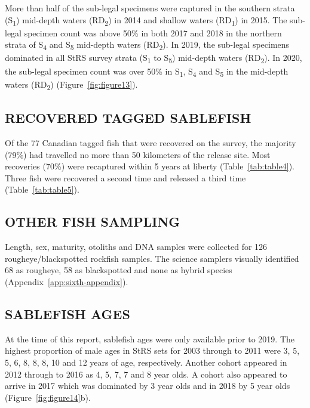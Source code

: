 \documentclass[12pt]{article}\usepackage[]{graphicx}\usepackage[]{color}
\begin{document}
More than half of the sub-legal specimens were captured in the southern strata (S\textsubscript{1}) mid-depth waters (RD\textsubscript{2}) in 2014 and shallow waters (RD\textsubscript{1}) in 2015. The sub-legal specimen count was above 50\% in both 2017 and 2018 in the northern strata of S\textsubscript{4} and S\textsubscript{5} mid-depth waters (RD\textsubscript{2}). In 2019, the sub-legal specimens dominated in all StRS survey strata (S\textsubscript{1} to S\textsubscript{5}) mid-depth waters (RD\textsubscript{2}). In 2020, the sub-legal specimen count was over 50\% in S\textsubscript{1}, S\textsubscript{4} and S\textsubscript{5} in the mid-depth waters (RD\textsubscript{2}) (Figure~\ref{fig:figure13}).

\hypertarget{recovered-tagged-sablefish}{%
\subsection{RECOVERED TAGGED SABLEFISH}\label{recovered-tagged-sablefish}}

Of the 77 Canadian tagged fish that were recovered on the survey, the majority (79\%) had travelled no more than 50 kilometers of the release site. Most recoveries (70\%) were recaptured within 5 years at liberty (Table~\ref{tab:table4}). Three fish were recovered a second time and released a third time (Table~\ref{tab:table5}).

\hypertarget{other-fish-sampling}{%
\subsection{OTHER FISH SAMPLING}\label{other-fish-sampling}}

Length, sex, maturity, otoliths and DNA samples were collected for 126 rougheye/blackspotted rockfish samples. The science samplers visually identified 68 as rougheye, 58 as blackspotted and none as hybrid species (Appendix~\ref{app:sixth-appendix}).

\hypertarget{sablefish-ages}{%
\subsection{SABLEFISH AGES}\label{sablefish-ages}}

At the time of this report, sablefish ages were only available prior to 2019. The highest proportion of male ages in StRS sets for 2003 through to 2011 were 3, 5, 5, 6, 8, 8, 8, 10 and 12 years of age, respectively. Another cohort appeared in 2012 through to 2016 as 4, 5, 7, 7 and 8 year olds. A cohort also appeared to arrive in 2017 which was dominated by 3 year olds and in 2018 by 5 year olds (Figure~\ref{fig:figure14}b).
\end{document}
